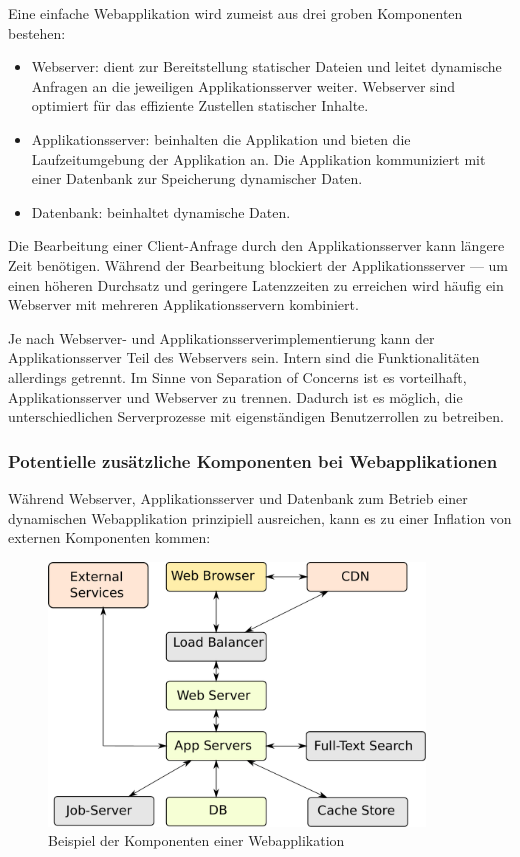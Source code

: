 Eine einfache Webapplikation wird zumeist aus drei groben Komponenten bestehen:

\begin{itemize}
	\item Webserver: dient zur Bereitstellung statischer Dateien und leitet dynamische Anfragen an die jeweiligen Applikationsserver weiter. Webserver sind optimiert für das effiziente Zustellen statischer Inhalte.
	\item Applikationsserver: beinhalten die Applikation und bieten die Laufzeitumgebung der Applikation an. Die Applikation kommuniziert mit einer Datenbank zur Speicherung dynamischer Daten.
	\item Datenbank: beinhaltet dynamische Daten.
\end{itemize}

Die Bearbeitung einer Client-Anfrage durch den Applikationsserver kann längere Zeit benötigen. Während der Bearbeitung blockiert der Applikationsserver --- um einen höheren Durchsatz und geringere Latenzzeiten zu erreichen wird häufig ein Webserver mit mehreren Applikationsservern kombiniert.

Je nach Webserver- und Applikationsserverimplementierung kann der Applikationsserver Teil des Webservers sein. Intern sind die Funktionalitäten allerdings getrennt. Im Sinne von Separation of Concerns ist es vorteilhaft, Applikationsserver und Webserver zu trennen. Dadurch ist es möglich, die unterschiedlichen Serverprozesse mit eigenständigen Benutzerrollen zu betreiben.

\subsubsection{Potentielle zusätzliche Komponenten bei Webapplikationen}

Während Webserver, Applikationsserver und Datenbank zum Betrieb einer dynamischen Webapplikation prinzipiell ausreichen, kann es zu einer Inflation von externen Komponenten kommen:

\begin{figure}[h!]
\includegraphics[width=10cm]{images/web_components.pdf}
\centering
\caption{Beispiel der Komponenten einer Webapplikation}
\end{figure}

